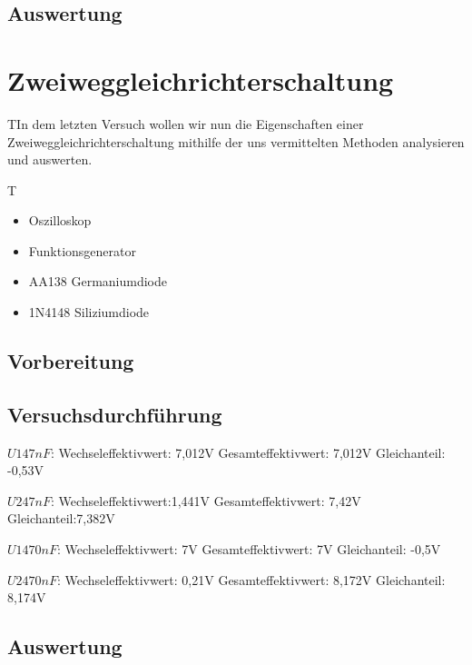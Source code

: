 \documentclass{article}
\begin{document}
\subsection{Auswertung}

\section{Zweiweggleichrichterschaltung}

\begin{task}
  TIn dem letzten Versuch wollen wir nun die Eigenschaften einer Zweiweggleichrichterschaltung mithilfe der uns vermittelten
  Methoden analysieren und auswerten.
\end{task}

\begin{devlist}
  T\begin{itemize}
    \item Oszilloskop
    \item Funktionsgenerator
    \item AA138 Germaniumdiode
    \item 1N4148 Siliziumdiode
  \end{itemize}
\end{devlist}

\subsection{Vorbereitung}

\subsection{Versuchsdurchführung}


$U1 47nF$:
Wechseleffektivwert: 7,012V
Gesamteffektivwert: 7,012V
Gleichanteil: -0,53V

$U2 47nF$:
Wechseleffektivwert:1,441V
Gesamteffektivwert: 7,42V
Gleichanteil:7,382V

$U1 470nF$:
Wechseleffektivwert: 7V
Gesamteffektivwert: 7V
Gleichanteil: -0,5V

$U2 470nF$:
Wechseleffektivwert: 0,21V
Gesamteffektivwert: 8,172V
Gleichanteil: 8,174V
\subsection{Auswertung}
\end{document}
